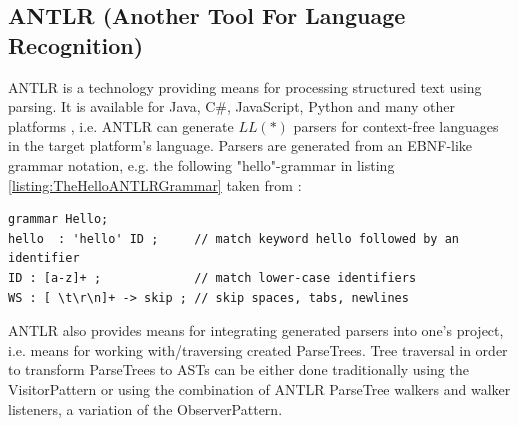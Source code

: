 \subsection{ANTLR (Another Tool For Language Recognition)}
\label{subsection:ANTLR}
\Gls{ANTLR} \cite{Parr:2013:DAR:2501720} is a technology providing means for processing structured text using parsing.
It is available for \gls{Java}, C\#, JavaScript, Python and many other platforms \cite{antlr.org}, i.e. \Gls{ANTLR} can generate $LL(*)$ parsers for context-free languages in the target platform's language.
Parsers are generated from an EBNF-like grammar notation, e.g. the following "hello"-grammar in listing \ref{listing:TheHelloANTLRGrammar} taken from \cite{ANTLRv4GettingStarted}:
\begin{lstlisting}[caption={The Hello ANTLR grammar},label={listing:TheHelloANTLRGrammar}]
grammar Hello;
hello  : 'hello' ID ;     // match keyword hello followed by an identifier
ID : [a-z]+ ;             // match lower-case identifiers
WS : [ \t\r\n]+ -> skip ; // skip spaces, tabs, newlines
\end{lstlisting}

\Gls{ANTLR} also provides means for integrating generated parsers into one's pro\-ject, i.e. means for working with/traversing created \glspl{ParseTree}.
Tree traversal in order to transform \glspl{ParseTree} to \glspl{AST} can be either done traditionally using the \gls{VisitorPattern} or using the combination of \gls{ANTLR} \gls{ParseTree} walkers and walker listeners, a variation of the \gls{ObserverPattern}.


